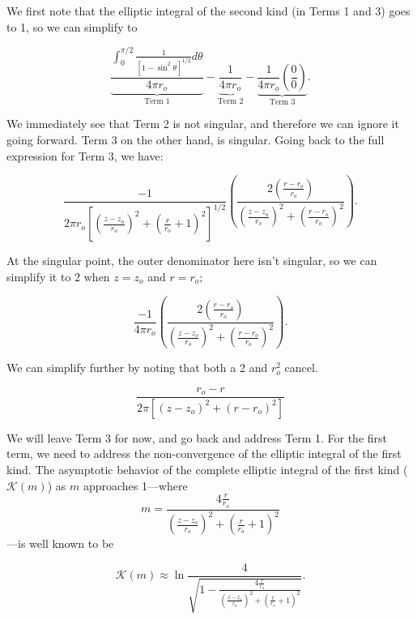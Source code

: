 \noindent We first note that the elliptic integral of the second kind (in Terms 1 and 3) goes to 1, so we can simplify to

\begin{equation}
    \underbrace{\frac{\int_0^{\pi/2}\frac{1}{\left[1-\sin^2\theta\right]^{1/2}}d\theta}{4\pi r_o}}_{\text{Term 1}}  -
    \underbrace{\frac{1}{4\pi r_o}}_{\text{Term 2}}  -
    \underbrace{\frac{1}{4\pi r_o}
    \left(\frac{0}{0}\right)}_{\text{Term 3}}.
\end{equation}

\noindent We immediately see that Term 2 is not singular, and therefore we can ignore it going forward.
%
Term 3 on the other hand, is singular.
%
Going back to the full expression for Term 3, we have:

\begin{equation}
\frac{-1}{2\pi r_o \left[\left(\frac{z-z_o}{r_o}\right)^2 + \left(\frac{r}{r_o}+1\right)^2\right]^{1/2}}
%
\left(\frac{2 \left(\frac{r-r_o}{r_o}\right)}{\left(\frac{z-z_o}{r_o}\right)^2 + \left(\frac{r-r_o}{r_o}\right)^2}\right).
\end{equation}

\noindent At the singular point, the outer denominator here isn't singular, so we can simplify it to 2 when \(z=z_o\) and \(r=r_o\);

\begin{equation}
\frac{-1}{4\pi r_o }
%
\left(\frac{2 \left(\frac{r-r_o}{r_o}\right)}{\left(\frac{z-z_o}{r_o}\right)^2 + \left(\frac{r-r_o}{r_o}\right)^2}\right).
\end{equation}

\noindent We can simplify further by noting that both a 2 and \(r_o^2\) cancel.

\begin{equation}
    \frac{r_o-r}{2\pi\left[\left(z-z_o\right)^2 + \left(r-r_o\right)^2\right] }
\end{equation}

We will leave Term 3 for now, and go back and address Term 1.
%
For the first term, we need to address the non-convergence of the elliptic integral of the first kind.
%
The asymptotic behavior of the complete elliptic integral of the first kind (\(\mathcal{K}(m)\)) as \(m\) approaches 1---where \[ m = \frac{4\frac{r}{r_o}}{\left(\frac{z-z_o}{r_o}\right)^2 + \left(\frac{r}{r_o}+1\right)^2} \]
---is well known to be

\begin{equation}
\mathcal{K}(m) \approx \ln \frac{4}{\sqrt{1-\frac{4\frac{r}{r_o}}{\left(\frac{z-z_o}{r_o}\right)^2 + \left(\frac{r}{r_o}+1\right)^2}}}.
\end{equation}

